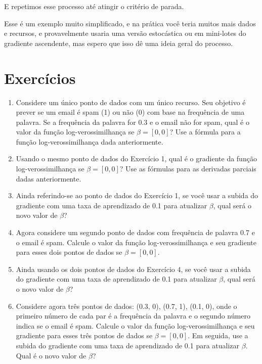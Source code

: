 \documentclass[12pt,a4paper, brazil]{article}
\begin{document}
E repetimos esse processo até atingir o critério de parada. 

Esse é um exemplo muito simplificado, e na prática você teria muitos mais dados e recursos, e provavelmente usaria uma versão estocástica ou em mini-lotes do gradiente ascendente, mas espero que isso dê uma ideia geral do processo.

\section{Exercícios}

\begin{enumerate}

\item Considere um único ponto de dados com um único recurso. Seu objetivo é prever se um email é spam (1) ou não (0) com base na frequência de uma palavra. Se a frequência da palavra for 0.3 e o email não for spam, qual é o valor da função log-verossimilhança se $\beta = [0, 0]$? Use a fórmula para a função log-verossimilhança dada anteriormente.

\item  Usando o mesmo ponto de dados do Exercício 1, qual é o gradiente da função log-verossimilhança se $\beta = [0, 0]$? Use as fórmulas para as derivadas parciais dadas anteriormente.

\item  Ainda referindo-se ao ponto de dados do Exercício 1, se você usar a subida do gradiente com uma taxa de aprendizado de 0.1 para atualizar $\beta$, qual será o novo valor de $\beta$?

\item Agora considere um segundo ponto de dados com frequência de palavra 0.7 e o email é spam. Calcule o valor da função log-verossimilhança e seu gradiente para esses dois pontos de dados se $\beta = [0, 0]$.

\item Ainda usando os dois pontos de dados do Exercício 4, se você usar a subida do gradiente com uma taxa de aprendizado de 0.1 para atualizar $\beta$, qual será o novo valor de $\beta$?

\item Considere agora três pontos de dados: (0.3, 0), (0.7, 1), (0.1, 0), onde o primeiro número de cada par é a frequência da palavra e o segundo número indica se o email é spam. Calcule o valor da função log-verossimilhança e seu gradiente para esses três pontos de dados se $\beta = [0, 0]$. Em seguida, use a subida do gradiente com uma taxa de aprendizado de 0.1 para atualizar $\beta$. Qual é o novo valor de $\beta$?

\end{enumerate}






\printbibliography
\end{document}
